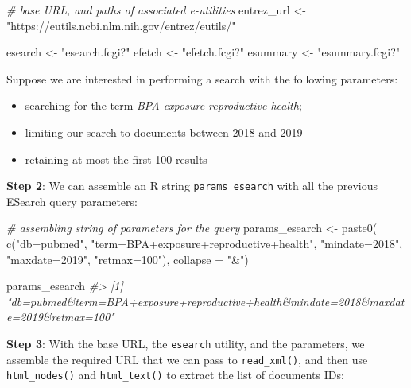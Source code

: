 \documentclass[
]{book}
\newenvironment{Shaded}{\begin{snugshade}}{\end{snugshade}}
\newcommand{\AttributeTok}[1]{\textcolor[rgb]{0.77,0.63,0.00}{#1}}
\newcommand{\CommentTok}[1]{\textcolor[rgb]{0.56,0.35,0.01}{\textit{#1}}}
\newcommand{\FunctionTok}[1]{\textcolor[rgb]{0.00,0.00,0.00}{#1}}
\newcommand{\NormalTok}[1]{#1}
\newcommand{\OtherTok}[1]{\textcolor[rgb]{0.56,0.35,0.01}{#1}}
\newcommand{\StringTok}[1]{\textcolor[rgb]{0.31,0.60,0.02}{#1}}
\begin{document}
\begin{Shaded}
\begin{Highlighting}[]
\CommentTok{\# base URL, and paths of associated e{-}utilities}
\NormalTok{entrez\_url }\OtherTok{\textless{}{-}} \StringTok{"https://eutils.ncbi.nlm.nih.gov/entrez/eutils/"}

\NormalTok{esearch }\OtherTok{\textless{}{-}} \StringTok{"esearch.fcgi?"}
\NormalTok{efetch }\OtherTok{\textless{}{-}} \StringTok{"efetch.fcgi?"}
\NormalTok{esummary }\OtherTok{\textless{}{-}} \StringTok{"esummary.fcgi?"}
\end{Highlighting}
\end{Shaded}

Suppose we are interested in performing a search with the following parameters:

\begin{itemize}
\item
  searching for the term \emph{BPA exposure reproductive health};
\item
  limiting our search to documents between 2018 and 2019
\item
  retaining at most the first 100 results
\end{itemize}

\textbf{Step 2}: We can assemble an R string \texttt{params\_esearch} with all the previous
ESearch query parameters:

\begin{Shaded}
\begin{Highlighting}[]
\CommentTok{\# assembling string of parameters for the query}
\NormalTok{params\_esearch }\OtherTok{\textless{}{-}} \FunctionTok{paste0}\NormalTok{(}
  \FunctionTok{c}\NormalTok{(}\StringTok{"db=pubmed"}\NormalTok{, }
    \StringTok{"term=BPA+exposure+reproductive+health"}\NormalTok{,}
    \StringTok{"mindate=2018"}\NormalTok{,}
    \StringTok{"maxdate=2019"}\NormalTok{,}
    \StringTok{"retmax=100"}\NormalTok{),}
  \AttributeTok{collapse =} \StringTok{"\&"}\NormalTok{)}

\NormalTok{params\_esearch}
\CommentTok{\#\textgreater{} [1] "db=pubmed\&term=BPA+exposure+reproductive+health\&mindate=2018\&maxdate=2019\&retmax=100"}
\end{Highlighting}
\end{Shaded}

\textbf{Step 3}: With the base URL, the \texttt{esearch} utility, and the parameters, we
assemble the required URL that we can pass to \texttt{read\_xml()}, and then use
\texttt{html\_nodes()} and \texttt{html\_text()} to extract the list of documents IDs:
\end{document}
